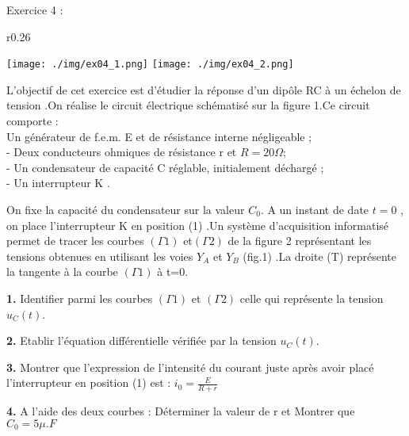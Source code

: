 \documentclass[12pt, french]{article}
\begin{document}
\begin{Box2}{Exercice 4 : }

	\begin{wrapfigure}{r}{0.26\textwidth}
		\begin{center}
			\vspace{-0.8cm}
			\texttt{[image: ./img/ex04\_1.png]}
			\texttt{[image: ./img/ex04\_2.png]}
			\caption{}
		\end{center}
	\end{wrapfigure}




	L’objectif de cet exercice est d’étudier la réponse d’un dipôle RC  à un échelon de tension .On réalise le circuit électrique schématisé sur la figure 1.Ce circuit comporte :
	\\Un générateur de f.e.m. E et de résistance
	interne négligeable ;
	\\- Deux conducteurs ohmiques de résistance r
	et $R=20\Omega$;
	\\- Un condensateur de capacité C réglable,
	initialement déchargé ;
	\\- Un interrupteur K .

	On fixe la capacité du condensateur sur la valeur $C_0$. A un instant de date $t=0$ , on place l’interrupteur
	K en position (1) .Un système d’acquisition informatisé permet de tracer les courbes $(\Gamma 1)$ et$(\Gamma 2)$ de la
	figure 2 représentant les tensions obtenues en utilisant les voies $Y_A$ et $Y_B$
	(fig.1) .La droite (T) représente la tangente à la courbe $(\Gamma 1)$ à t=0.

	\textbf{1. }Identifier parmi les courbes $(\Gamma 1)$ et $(\Gamma 2)$ celle qui représente la tension $u_C(t)$.

	\textbf{2. }Etablir l’équation différentielle vérifiée par la tension $u_C(t)$.

	\textbf{3. }Montrer que l’expression de l’intensité du courant juste après avoir placé l’interrupteur en position (1) est : $i_0 = \frac{E}{R+r}$

	\textbf{4. }A l’aide des deux courbes : Déterminer la valeur de r et Montrer que $C_0 = 5\mu.F$

\end{Box2}





\end{document}
